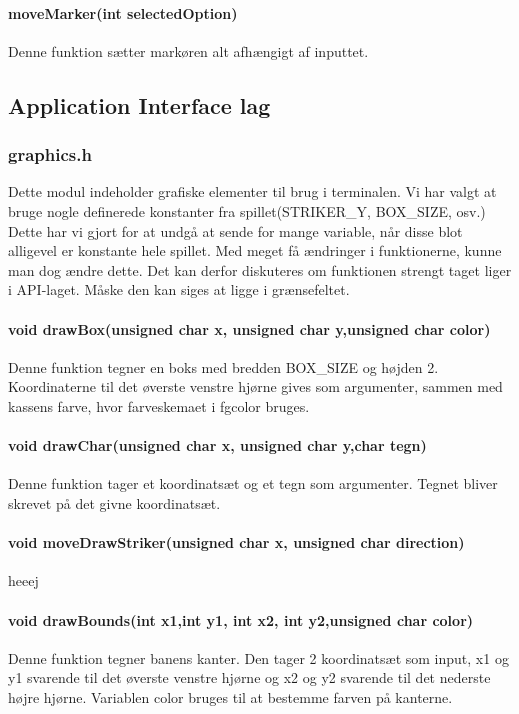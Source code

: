 \paragraph{moveMarker(int selectedOption)}
Denne funktion sætter markøren alt afhængigt af inputtet.

\subsection{Application Interface lag}
\subsubsection{graphics.h}
Dette modul indeholder grafiske elementer til brug i terminalen. Vi har valgt at bruge nogle definerede konstanter fra spillet(STRIKER\_Y, BOX\_SIZE, osv.) Dette har vi gjort for at undgå at sende for mange variable, når disse blot alligevel er konstante hele spillet. Med meget få ændringer i funktionerne, kunne man dog ændre dette. Det kan derfor diskuteres om funktionen strengt taget liger i API-laget. Måske den kan siges at ligge i grænsefeltet.
\paragraph{
void drawBox(unsigned char x, unsigned char y,unsigned char color)}
Denne funktion tegner en boks med bredden BOX\_SIZE og højden 2. Koordinaterne til det øverste venstre hjørne gives som argumenter, sammen med kassens farve, hvor farveskemaet i fgcolor bruges.

\paragraph{void drawChar(unsigned char x, unsigned char y,char tegn)}
Denne funktion tager et koordinatsæt og et tegn som argumenter. Tegnet bliver skrevet på det givne koordinatsæt.

\paragraph{void moveDrawStriker(unsigned char x, unsigned char direction)}
heeej

\paragraph{void drawBounds(int x1,int y1, int x2, int y2,unsigned char color)}
Denne funktion tegner banens kanter. Den tager 2 koordinatsæt som input, x1 og y1 svarende til det øverste venstre hjørne og  x2 og y2 svarende til det nederste højre hjørne. Variablen color bruges til at bestemme farven på kanterne. 


